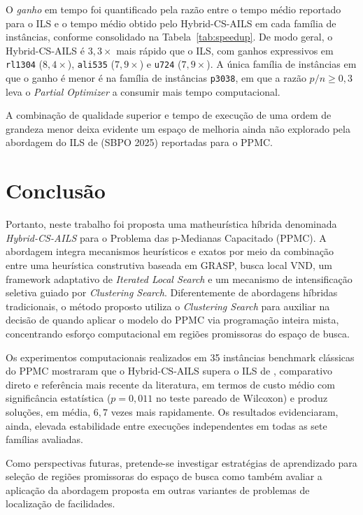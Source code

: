 \documentclass[a4paper,11pt]{article}
\begin{document}
O \emph{ganho} em tempo foi quantificado pela razão entre o tempo médio
reportado para o ILS e o tempo médio obtido pelo Hybrid-CS-AILS em cada
família de instâncias, conforme consolidado na Tabela~\ref{tab:speedup}.
De modo geral, o Hybrid-CS-AILS é $3{,}3\times$ mais rápido que o ILS,
com ganhos expressivos em \texttt{rl1304} ($8{,}4\times$),
\texttt{ali535} ($7{,}9\times$) e \texttt{u724} ($7{,}9\times$).
A única família de instâncias em que o ganho é menor é na família de instâncias \texttt{p3038},
em que a razão $p/n \geq 0{,}3$ leva o \textit{Partial Optimizer} a
consumir mais tempo computacional.






A combinação de qualidade superior e tempo de execução de uma ordem de grandeza menor deixa evidente um espaço de melhoria ainda não explorado pela abordagem do ILS de \cite{freitas2025ils_pmediana} (SBPO 2025) reportadas para o PPMC.


\section{Conclusão}
\label{secCon}

Portanto, neste trabalho foi proposta uma matheurística híbrida denominada \textit{Hybrid-CS-AILS} para o Problema das p-Medianas Capacitado (PPMC). A abordagem integra mecanismos heurísticos e exatos por meio da combinação entre uma heurística construtiva baseada em GRASP, busca local VND, um framework adaptativo de \textit{Iterated Local Search} e um mecanismo de intensificação seletiva guiado por \textit{Clustering Search}. Diferentemente de abordagens híbridas tradicionais, o método proposto utiliza o \textit{Clustering Search} para auxiliar na decisão de quando aplicar o modelo do PPMC via programação inteira mista, concentrando esforço computacional em regiões promissoras do espaço de busca.

Os experimentos computacionais realizados em 35 instâncias benchmark clássicas do PPMC mostraram que o Hybrid-CS-AILS supera o ILS de \cite{freitas2025ils_pmediana}, comparativo direto e referência mais recente da literatura, em termos de custo médio com significância estatística ($p = 0{,}011$ no teste pareado de Wilcoxon) e produz soluções, em média, $6{,}7$ vezes mais rapidamente. Os resultados evidenciaram, ainda, elevada estabilidade entre execuções independentes em todas as sete famílias avaliadas.

Como perspectivas futuras, pretende-se investigar estratégias de aprendizado para seleção de regiões promissoras do espaço de busca como também avaliar a aplicação da abordagem proposta em outras variantes de problemas de localização de facilidades. 
\end{document}
